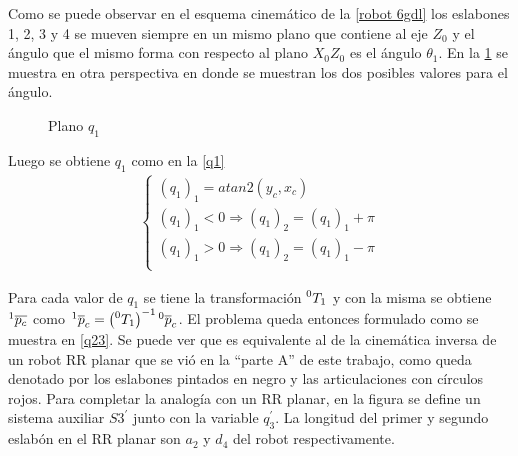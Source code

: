 \documentclass[a4paper,12pt]{article}
\begin{document}
Como se puede observar en el esquema cinemático de la \cref{robot 6gdl} los eslabones
1, 2, 3 y 4 se mueven siempre en un mismo plano que contiene al eje $Z_0$ y el ángulo que
el mismo forma con respecto al plano $X_0Z_0$ es el ángulo $\theta_1$. En la \cref{plano q1} se muestra en otra perspectiva
en donde se muestran los dos posibles valores para el ángulo.

\begin{figure}[H]
    \centering
    \begin{adjustbox}{max width=\columnwidth}
    \end{adjustbox}
    \caption{Plano $q_1$}
    \label{plano q1}
\end{figure}

Luego se obtiene $q_1$ como en la \cref{q1}
\begin{align}
    \begin{cases}
        (q_1)_1 = atan2(y_c, x_c)\\
        (q_1)_1 < 0 \Rightarrow (q_1)_2 = (q_1)_1 + \pi\\
        (q_1)_1 > 0 \Rightarrow (q_1)_2 = (q_1)_1 - \pi\\
    \end{cases}
    \label{q1}
\end{align}

Para cada valor de $q_1$ se tiene la transformación
$\prescript{0}{}{T_1}$ y con la misma se obtiene $\prescript{1}{}{\overline{p_c}}$ como
$\prescript{1}{}{\overline{p}_c} = \left(\prescript{0}{}{T_1}\right)^{-1}\prescript{0}{}{\overline{p}_c}$.
El problema queda entonces formulado como se muestra en \cref{q23}. Se puede ver que  
es equivalente al de la cinemática inversa de un robot RR planar que se vió en la ``parte A'' de este trabajo, como 
queda denotado por los eslabones pintados en negro y las articulaciones con círculos rojos. Para completar la analogía con un RR planar, en la figura se define un sistema 
auxiliar $S3^{\prime}$ junto con la variable $q_3^{\prime}$. La longitud del primer y segundo eslabón en el RR planar son $a_2$ y $d_4$ del robot respectivamente.
\end{document}
